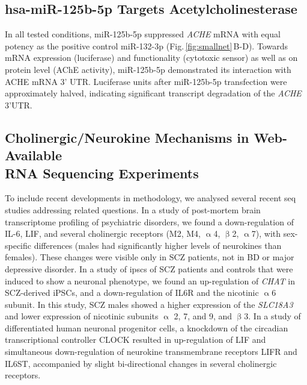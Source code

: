 \begin{method}
\end{method}

\subsection{hsa-miR-125b-5p Targets Acetylcholinesterase}
In all tested conditions, miR-125b-5p suppressed \emph{ACHE} mRNA with equal potency as the positive control miR-132-3p (Fig.\,\ref{fig:smallnet}\,B-D). Towards mRNA expression (luciferase) and functionality (cytotoxic sensor) as well as on protein level (AChE activity), miR-125b-5p demonstrated its interaction with ACHE mRNA 3' UTR. Luciferase units after miR-125b-5p transfection were approximately halved, indicating significant transcript degradation of the \emph{ACHE} 3'UTR.

\subsection{Cholinergic/Neurokine Mechanisms in Web-Available\\ RNA Sequencing Experiments}
To include recent developments in methodology, we analysed several recent \ac{seq} studies addressing related questions. In a study of post-mortem brain transcriptome profiling of psychiatric disorders,\cite{Ramaker2017} we found a down-regulation of IL-6, LIF, and several cholinergic receptors (M2, M4, $\upalpha$4, $\upbeta$2, $\upalpha$7), with sex-specific differences (males had significantly higher levels of neurokines than females). These changes were visible only in SCZ patients, not in BD or major depressive disorder. In a study of \acp{ipsc} of SCZ patients and controls that were induced to show a neuronal phenotype,\cite{Hoffman2017} we found an up-regulation of \emph{CHAT} in SCZ-derived iPSCs, and a down-regulation of IL6R and the nicotinic $\upalpha$6 subunit. In this study, SCZ males showed a higher expression of the \emph{SLC18A3} and lower expression of nicotinic subunits $\upalpha$ 2, 7, and 9, and $\upbeta$3. In a study of differentiated human neuronal progenitor cells,\cite{Fontenot2017} a knockdown of the circadian transcriptional controller CLOCK resulted in up-regulation of LIF and simultaneous down-regulation of neurokine transmembrane receptors LIFR and IL6ST, accompanied by slight bi-directional changes in several cholinergic receptors.
